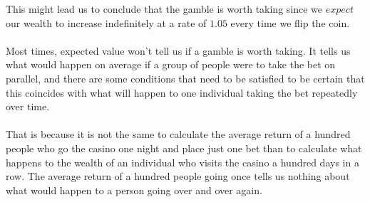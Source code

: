 \documentclass[12pt]{article}
\begin{document}
This might lead us to conclude that the gamble is worth taking since we $expect$ our wealth to increase indefinitely at a rate of $1.05$ every time we flip the coin.
\\\\
Most times, expected value won't tell us if a gamble is worth taking. It tells us what would happen on average if a group of people were to take the bet on parallel, and there are some conditions that need to be satisfied to be certain that this coincides with what will happen to one individual taking the bet repeatedly over time.
\\\\
That is because it is not the same to calculate the average return of a hundred people who go the casino one night and place just one bet than to calculate what happens to the wealth of an individual who visits the casino a hundred days in a row. The average return of a hundred people going once tells us nothing about what would happen to a person going over and over again. 
\end{document}
